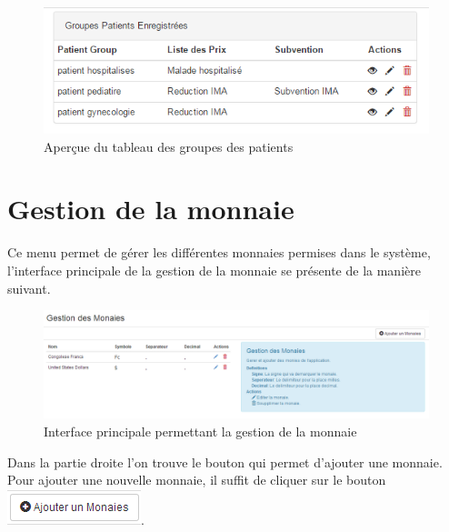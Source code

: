 \documentclass[12pt,a4paper]{report}
\begin{document}
\begin{figure}[h]
\begin{center}
\includegraphics[width=12cm]{pic/TabGroupMalade.png}
\end{center}
\caption{Aperçue du tableau des groupes des patients}
\label{Aperçue du tableau des groupes des patients}
\end{figure}
\newpage

\section{Gestion de la monnaie}
Ce menu permet de gérer les différentes monnaies permises dans le système, l'interface principale de la gestion de la monnaie se présente de la manière suivant.

\begin{figure}[h]
\begin{center}
\includegraphics[width=16cm]{pic/AdminCurrency.png}
\end{center}
\caption{Interface principale permettant la gestion de la monnaie}
\label{Interface principale permettant la gestion de la monnaie}
\end{figure}

Dans la partie droite l'on trouve le bouton qui permet d'ajouter une monnaie. Pour ajouter une nouvelle monnaie, il suffit de cliquer sur le bouton \includegraphics[scale=0.7]{pic/AddMonney.png}.
\end{document}
